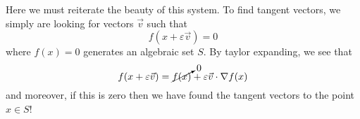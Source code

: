 \documentclass{amsart}
\begin{document}
Here we must reiterate the beauty of this system. To find tangent vectors, we 
simply are looking for vectors $\vec{v}$ such that
\begin{equation}
f(x + \varepsilon\vec{v}) = 0
\end{equation}
where $f(x)=0$ generates an algebraic set $S$. By taylor expanding, we see that
\begin{equation}
f(x + \varepsilon\vec{v}) = \cancelto{0}{f(x)} + \varepsilon\vec{v}\cdot\nabla f(x)
\end{equation}
and moreover, if this is zero then we have found the tangent vectors to the
point $x\in S$!




\appendix




\end{document}

